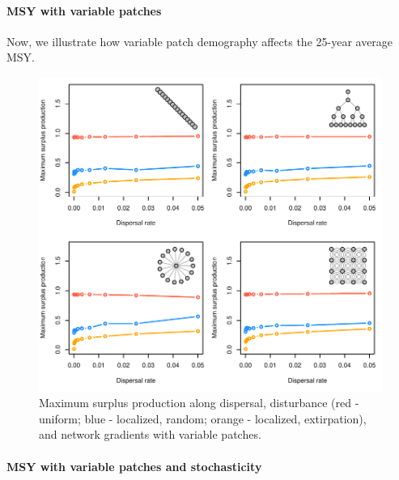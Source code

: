 \documentclass[]{article}
\let\oldparagraph\paragraph
\renewcommand{\paragraph}[1]{\oldparagraph{#1}\mbox{}}
\begin{document}
\newpage

\hypertarget{msy-with-variable-patches}{%
\paragraph{MSY with variable patches}\label{msy-with-variable-patches}}

Now, we illustrate how variable patch demography affects the 25-year
average MSY.

\begin{figure}[H]

{\centering \includegraphics{Managing_for_ecological_surprises_in_metapopulations_files/figure-latex/MSY with variable patches-1} 

}

\caption{Maximum surplus production along dispersal, disturbance (red - uniform; blue - localized, random; orange - localized, extirpation), and network gradients with variable patches.}\label{fig:MSY with variable patches}
\end{figure}
\newpage

\hypertarget{msy-with-variable-patches-and-stochasticity}{%
\paragraph{MSY with variable patches and
stochasticity}\label{msy-with-variable-patches-and-stochasticity}}
\end{document}
